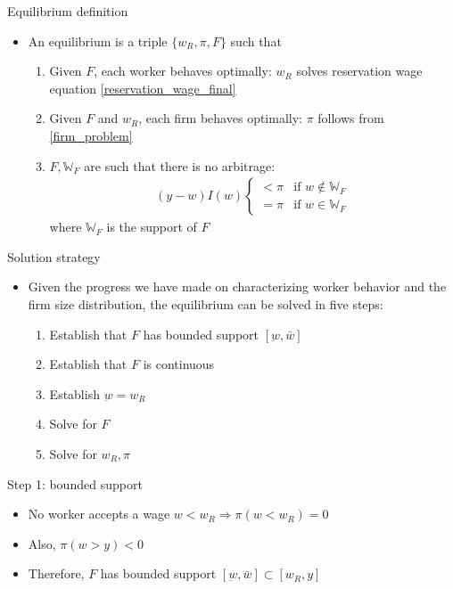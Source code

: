 \documentclass[9pt]{beamer}
\newcommand{\bit}{\begin{itemize}}
\newcommand{\eit}{\end{itemize}}
\newcommand{\ben}{\begin{enumerate}}
\newcommand{\een}{\end{enumerate}}
\begin{document}
\begin{frame}{Equilibrium definition}

\bit
\setlength\itemsep{1.5em}

\item An equilibrium is a triple $\{w_R, \pi, F\}$ such that
\ben
	\setlength\itemsep{1em}
	\item Given $F$, each worker behaves optimally: $w_R$ solves reservation wage equation \eqref{reservation_wage_final} 
	
	\item Given $F$ and $w_R$, each firm behaves optimally:  $\pi$ follows from \eqref{firm_problem}
	
	\item $F, \mathbb{W}_F$ are such that there is no arbitrage:
	\begin{eqnarray}
	(y-w)I(w) \left\{ \begin{array}{cc}
	< \pi & \text{if } w \notin \mathbb{W}_F \\
	= \pi & \text{if } w \in \mathbb{W}_F
	\end{array} \right. \nonumber
	\end{eqnarray}
	where $\mathbb{W}_F$ is the support of $F$
\een

\eit

\end{frame}


\begin{frame}{Solution strategy}

\bit
\setlength\itemsep{1.5em}

\item Given the progress we have made on characterizing worker behavior and the firm size distribution, the equilibrium can be solved in five steps:
\ben
\setlength\itemsep{1em}
\item Establish that $F$ has bounded support $[\underbar w, \bar w]$

\item Establish that $F$ is continuous

\item Establish $\underbar w = w_R$

\item Solve for $F$

\item Solve for $w_R, \pi$
\een


\eit

\end{frame}


\begin{frame}{Step 1: bounded support}

\bit
\setlength\itemsep{2em}

\item No worker accepts a wage $w < w_R \Rightarrow \pi(w<w_R) = 0$

\item Also, $\pi(w>y) < 0$

\item Therefore, $F$ has bounded support $[\underbar w, \bar w] \subset [w_R, y]$

\eit

\end{frame}
\end{document}
